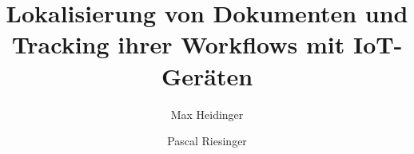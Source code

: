 \usepackage{ifthen}

\usepackage{titling}         %

\author{Max Heidinger \and Pascal Riesinger}

\title{Lokalisierung von Dokumenten und Tracking ihrer Workflows mit IoT-Geräten}

\newcommand{\titelheader}{Topologie- und Ressourcendaten im IaaS-Umfeld}
\newcommand{\arbeit}{Studienarbeit}
\newcommand{\studiengang}{Informatik}
\newcommand{\studienjahr}{2017}
\newcommand{\verfassungsort}{Karlsruhe}
\newcommand{\matrikelnr}{}
\newcommand{\kurs}{TINF17B1}
\newcommand{\bearbeitungsmonat}{September 2019}
\newcommand{\abgabe}{16. \bearbeitungsmonat}
\newcommand{\bearbeitungszeitraum}{01.07.2019 - 16.09.2019}
\newcommand{\firmaName}{DHBW Karlsruhe}
\newcommand{\firmaStrasse}{Erzbergerstraße 121}
\newcommand{\firmaOrt}{Karlsruhe}
\newcommand{\firmaPlz}{76133 \firmaOrt, Deutschland}
\newcommand{\betreuerFirma}{}
\newcommand{\betreuerDhbw}{Prof. Dr. Marcus Strand}

